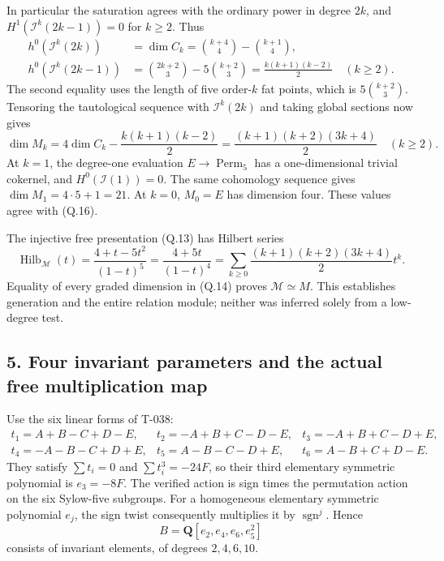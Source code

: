 \documentclass[
  10pt,
]{article}
\begin{document}
In particular the saturation agrees with the ordinary power in degree
\(2k\), and \(H^1(\mathcal I^k(2k-1))=0\) for \(k\ge2\). Thus \[
\begin{aligned}
h^0(\mathcal I^k(2k))
 &=\dim C_k=\binom{k+4}{4}-\binom{k+1}{4},\\
h^0(\mathcal I^k(2k-1))
 &=\binom{2k+2}{3}-5\binom{k+2}{3}
 =\frac{k(k+1)(k-2)}2 \quad(k\ge2).
\end{aligned}
\tag{Q.15}
\] The second equality uses the length of five order-\(k\) fat points,
which is \(5\binom{k+2}{3}\). Tensoring the tautological sequence with
\(\mathcal I^k(2k)\) and taking global sections now gives \[
\dim M_k=4\dim C_k-\frac{k(k+1)(k-2)}2
=\frac{(k+1)(k+2)(3k+4)}2\quad(k\ge2).
\tag{Q.16}
\] At \(k=1\), the degree-one evaluation \(E\to\operatorname{Perm}_5\)
has a one-dimensional trivial cokernel, and \(H^0(\mathcal I(1))=0\).
The same cohomology sequence gives \(\dim M_1=4\cdot5+1=21\). At
\(k=0\), \(M_0=E\) has dimension four. These values agree with (Q.16).

The injective free presentation (Q.13) has Hilbert series \[
\operatorname{Hilb}_{\mathcal M}(t)
=\frac{4+t-5t^2}{(1-t)^5}
=\frac{4+5t}{(1-t)^4}
=\sum_{k\ge0}\frac{(k+1)(k+2)(3k+4)}2t^k.
\tag{Q.17}
\] Equality of every graded dimension in (Q.14) proves
\(\mathcal M\simeq M\). This establishes generation and the entire
relation module; neither was inferred solely from a low-degree test.

\subsection{5. Four invariant parameters and the actual free
multiplication
map}\label{four-invariant-parameters-and-the-actual-free-multiplication-map}

Use the six linear forms of T-038: \[
\begin{array}{lll}
t_1=A+B-C+D-E,&t_2=-A+B+C-D-E,&t_3=-A+B+C-D+E,\\
t_4=-A-B-C+D+E,&t_5=A-B-C-D+E,&t_6=A-B+C+D-E.
\end{array}
\tag{Q.18}
\] They satisfy \(\sum t_i=0\) and \(\sum t_i^3=-24F\), so their third
elementary symmetric polynomial is \(e_3=-8F\). The verified action is
sign times the permutation action on the six Sylow-five subgroups. For a
homogeneous elementary symmetric polynomial \(e_j\), the sign twist
consequently multiplies it by \(\operatorname{sgn}^j\). Hence \[
B=\mathbf Q[e_2,e_4,e_6,e_5^2]
\tag{Q.19}
\] consists of invariant elements, of degrees \(2,4,6,10\).
\end{document}
